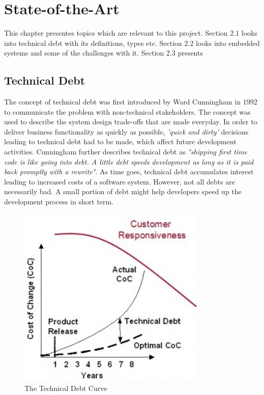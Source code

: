 \chapter{State-of-the-Art}
This chapter presentes topics which are relevant to this project. Section 2.1 looks into technical debt with its definitions, types etc. Section 2.2 looks into embedded systems and some of the challenges with it. Section 2.3 presents 


\section{Technical Debt}
The concept of technical debt was first introduced by Ward Cunningham in 1992 to communicate the problem with non-technical stakeholders\cite{p29-cunningham}. The concept was used to describe the system design trade-offs that are made everyday. In order to deliver business functionality as quickly as possible, \textit{'quick and dirty'} decisions leading to technical debt had to be made, which affect future development activities. Cunningham further describes technical debt as \textit{"shipping first time code is like going into debt. A little debt speeds development as long as it is paid back promptly with a rewrite"}. As time goes, technical debt accumulates interest leading to increased costs of a software system\cite{p31-guo,p35-klinger}. However, not all debts are necessarily bad. A small portion of debt might help developers speed up the development process in short term\cite{p31-guo}. 


\begin{figure}[ht!]
	\centering
	\includegraphics[width=0.8\textwidth]{images/techdebtCurve.jpg}
	\caption{The Technical Debt Curve\cite{jim-highsmith}}
	\label{fig:techDebtCurve}
\end{figure}

